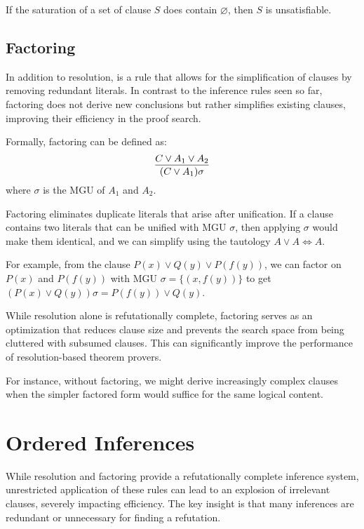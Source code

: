 If the saturation of a set of clause \(S\) does contain \(\varnothing\), then \(S\) is unsatisfiable.

\subsection{Factoring}\label{subsec:factoring}

In addition to resolution,  is a rule that allows for the simplification of clauses by removing redundant literals.
In contrast to the inference rules seen so far, factoring does not derive new conclusions but rather simplifies existing clauses, improving their efficiency in the proof search.

Formally, factoring can be defined as:
\begin{equation}
  \infer{(C \lor A_1)\sigma}{C \lor A_1 \lor A_2}
\end{equation}
\indent where \(\sigma\) is the MGU of \(A_1\) and \(A_2\).

\noindent Factoring eliminates duplicate literals that arise after unification. If a clause contains two literals that can be unified with MGU \(\sigma\), then applying \(\sigma\) would make them identical, and we can simplify using the tautology \(A \lor A \iff A\).

For example, from the clause \(P(x) \lor Q(y) \lor P(f(y))\), we can factor on \(P(x)\) and \(P(f(y))\) with MGU \(\sigma = \{(x , f(y))\}\) to get \((P(x) \lor Q(y))\sigma = P(f(y)) \lor Q(y)\).

While resolution alone is refutationally complete, factoring serves as an optimization that reduces clause size and prevents the search space from being cluttered with subsumed clauses. This can significantly improve the performance of resolution-based theorem provers.

For instance, without factoring, we might derive increasingly complex clauses when the simpler factored form would suffice for the same logical content.

\section{Ordered Inferences}\label{sec:ordered-inferences}

While resolution and factoring provide a refutationally complete inference system, unrestricted application of these rules can lead to an explosion of irrelevant clauses, severely impacting efficiency. The key insight is that many inferences are redundant or unnecessary for finding a refutation.

